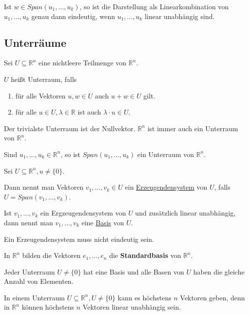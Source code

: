 \documentclass{mg2}
\begin{document}
\begin{lemma}
Ist $w \in Span(u_1,\dots,u_k)$, so ist die Darstellung als Linearkombination von $u_1,\dots,u_k$ genau dann eindeutig, wenn $u_1,\dots,u_k$ linear unabhängig sind.
\end{lemma}

\newpage
\subsection{Unterräume}
\begin{definition}[Unterraum]
Sei $U \subseteq \mathbb{R}^n$ eine nichtleere Teilmenge von $\mathbb{R}^n$.

$U$ heißt Unterraum, falls
\begin{enumerate}
\item für alle Vektoren $u,w \in U$ auch $u+w \in U$ gilt.
\item für alle $u \in U, \lambda \in \mathbb{R}$ ist auch $\lambda \cdot u \in U$.
\end{enumerate}
\end{definition}

Der trivialste Unterraum ist der Nullvektor. $\mathbb{R}^n$ ist immer auch ein Unterraum von $\mathbb{R}^n$.

\begin{proposition}
Sind $u_1,\dots,u_k \in \mathbb{R}^n$, so ist $Span(u_1,\dots,u_k)$ ein Unterraum von $\mathbb{R}^n$.
\end{proposition}

\begin{definition}
Sei $U \subseteq \mathbb{R}^n, u \neq \{0\}$.

Dann nennt man Vektoren $v_1,\dots, v_k \in U$ ein \underline{Erzeugendensystem} von $U$, falls $U = Span(v_1,\dots,v_k)$.

Ist $v_1,\dots,v_k$ ein Ergzeugendensystem von $U$ und zusätzlich linear unabhängig, dann nennt man $v_1,\dots,v_k$ eine \underline{Basis} von $U$.
\end{definition}

Ein Erzeugendensystem muss nicht eindeutig sein.

In $\mathbb{R}^n$ bilden die Vektoren $e_1, \dots, e_n$ die \textbf{Standardbasis} von $\mathbb{R}^n$.

Jeder Unterraum $U \neq \{0\}$ hat eine Basis und alle Basen von $U$ haben die gleiche Anzahl von Elementen.

In einem Unterraum $U \subseteq \mathbb{R}^n, U \neq \{0\}$ kann es höchstens $n$ Vektoren geben, denn in $\mathbb{R}^n$ können höchstens $n$ Vektoren linear unabhängig sein.
\end{document}

